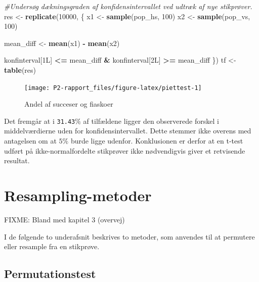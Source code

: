 \documentclass[
]{book}
\newenvironment{Shaded}{\begin{snugshade}}{\end{snugshade}}
\newcommand{\CommentTok}[1]{\textcolor[rgb]{0.56,0.35,0.01}{\textit{#1}}}
\newcommand{\DecValTok}[1]{\textcolor[rgb]{0.00,0.00,0.81}{#1}}
\newcommand{\KeywordTok}[1]{\textcolor[rgb]{0.13,0.29,0.53}{\textbf{#1}}}
\newcommand{\NormalTok}[1]{#1}
\newcommand{\OperatorTok}[1]{\textcolor[rgb]{0.81,0.36,0.00}{\textbf{#1}}}
\newcommand{\StringTok}[1]{\textcolor[rgb]{0.31,0.60,0.02}{#1}}
\theoremstyle{definition}
\theoremstyle{definition}
\theoremstyle{definition}
\theoremstyle{remark}
\begin{document}
\begin{Shaded}
\begin{Highlighting}[]
\CommentTok{#Undersøg dækningsgraden af konfidensintervallet ved udtræk af nye stikprøver.}
\NormalTok{res <-}\StringTok{ }\KeywordTok{replicate}\NormalTok{(}\DecValTok{10000}\NormalTok{, \{}
\NormalTok{  x1 <-}\StringTok{ }\KeywordTok{sample}\NormalTok{(pop_hs, }\DecValTok{100}\NormalTok{)}
\NormalTok{  x2 <-}\StringTok{ }\KeywordTok{sample}\NormalTok{(pop_vs, }\DecValTok{100}\NormalTok{)}
  
\NormalTok{  mean_diff <-}\StringTok{ }\KeywordTok{mean}\NormalTok{(x1) }\OperatorTok{-}\StringTok{ }\KeywordTok{mean}\NormalTok{(x2)}
  
\NormalTok{  konfinterval[1L] }\OperatorTok{<=}\StringTok{ }\NormalTok{mean_diff }\OperatorTok{&}\StringTok{ }\NormalTok{konfinterval[2L] }\OperatorTok{>=}\StringTok{ }\NormalTok{mean_diff}
\NormalTok{\})}
\NormalTok{tf <-}\StringTok{ }\KeywordTok{table}\NormalTok{(res)}
\end{Highlighting}
\end{Shaded}

\begin{figure}

{\centering \texttt{[image: P2-rapport\_files/figure-latex/piettest-1]} 

}

\caption{Andel af succeser og fiaskoer}\label{fig:piettest}
\end{figure}

Det fremgår at i \texttt{31.43}\(\%\) af tilfældene ligger den observerede forskel i middelværdierne uden for konfidensintervallet. Dette stemmer ikke overens med antagelsen om at \(5\%\) burde ligge udenfor. Konklusionen er derfor at en t-test udført på ikke-normalfordelte stikprøver ikke nødvendigvis giver et retvisende resultat.

\hypertarget{resampling-metoder}{%
\chapter{Resampling-metoder}\label{resampling-metoder}}

FIXME: Bland med kapitel 3 (overvej)

I de følgende to underafsnit beskrives to metoder, som anvendes til at permutere eller resample fra en stikprøve.

\hypertarget{permutationstest}{%
\section{Permutationstest}\label{permutationstest}}
\end{document}
